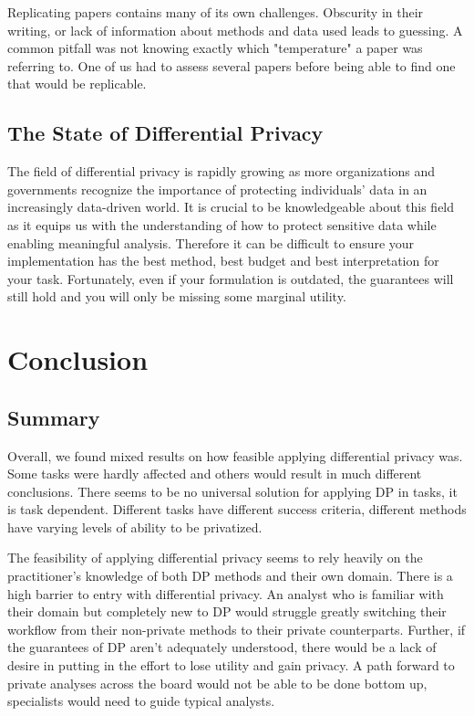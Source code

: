 \documentclass[12pt,letterpaper]{article}
\begin{document}
Replicating papers contains many of its own challenges. Obscurity in their writing, or lack of information about methods and data used leads to guessing. A common pitfall was not knowing exactly which "temperature" a paper was referring to. One of us had to assess several papers before being able to find one that would be replicable.


\subsection{The State of Differential Privacy}
The field of differential privacy is rapidly growing as more organizations and governments recognize the importance of protecting individuals' data in an increasingly data-driven world. It is crucial to be knowledgeable about this field as it equips us with the understanding of how to protect sensitive data while enabling meaningful analysis. Therefore it can be difficult to ensure your implementation has the best method, best budget and best interpretation for your task. Fortunately, even if your formulation is outdated, the guarantees will still hold and you will only be missing some marginal utility. 


\section{Conclusion}


\subsection{Summary}
Overall, we found mixed results on how feasible applying differential privacy was. Some tasks were hardly affected and others would result in much different conclusions. There seems to be no universal solution for applying DP in tasks, it is task dependent. Different tasks have different success criteria, different methods have varying levels of ability to be privatized.

The feasibility of applying differential privacy seems to rely heavily on the practitioner's knowledge of both DP methods and their own domain. There is a high barrier to entry with differential privacy. An analyst who is familiar with their domain but completely new to DP would struggle greatly switching their workflow from their non-private methods to their private counterparts. Further, if the guarantees of DP aren't adequately understood, there would be a lack of desire in putting in the effort to lose utility and gain privacy. A path forward to private analyses across the board would not be able to be done bottom up, specialists would need to guide typical analysts.
\end{document}
